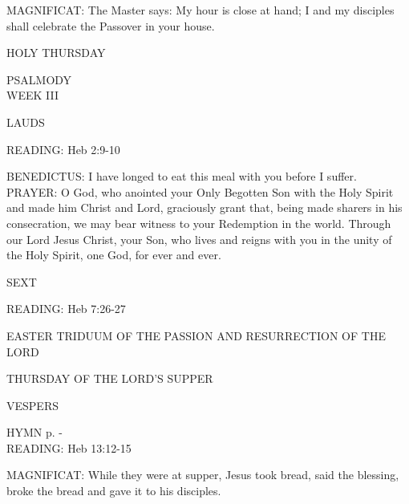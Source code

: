 \noindent\small{\uppercase{MAGNIFICAT:}}	The Master says: My hour is close at hand; I and my disciples shall celebrate the Passover in your house.\\

	\begin{center}
\normalsize HOLY THURSDAY
	\end{center}
\noindent\small{\uppercase{PSALMODY}\\} WEEK III

\begin{flushleft}\normalsize{\uppercase{LAUDS\\}}\end{flushleft}
\noindent\small{\uppercase{READING:}}    Heb 2:9-10 \textbf{   \\}

\noindent\small{\uppercase{BENEDICTUS:}}	I have longed to eat this meal with you before I suffer.\\

\noindent\small{\uppercase{PRAYER:}}	O God, who anointed your Only Begotten Son with the Holy Spirit and made him Christ and Lord, graciously grant that, being made sharers in his consecration, we may bear witness to your Redemption in the world. Through our Lord Jesus Christ, your Son, who lives and reigns with you in the unity of the Holy Spirit, one God, for ever and ever.

\begin{flushleft}\normalsize{\uppercase{SEXT\\}}\end{flushleft}
\noindent\small{\uppercase{READING:}}    Heb 7:26-27 \textbf{   \\}

EASTER TRIDUUM
OF THE PASSION AND RESURRECTION
OF THE LORD

	\begin{center}
\normalsize THURSDAY OF THE LORD'S SUPPER
	\end{center}

\begin{flushleft}\normalsize{\uppercase{VESPERS\\}}\end{flushleft}
\small{\uppercase{HYMN} p. \pageref{lent:firstHymn}-\pageref{lent:lastHymn}\\}
\noindent\small{\uppercase{READING:}}    Heb 13:12-15 \textbf{   \\}

\noindent\small{\uppercase{MAGNIFICAT:}}	While they were at supper, Jesus took bread, said the blessing, broke the bread and gave it to his disciples.\\

